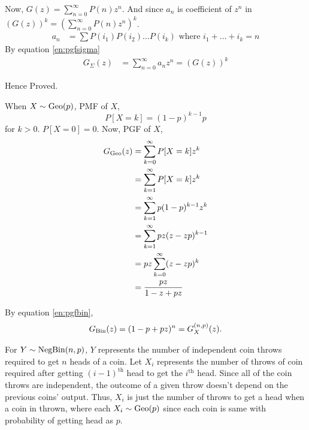 \begin{solution}
	Now, $G(z) = \sum_{n=0}^\infty P(n)z^n$.
	And since $a_n$ is coefficient of $z^n$ in $\left(G(z)\right)^k = (\sum_{n=0}^\infty P(n)z^n)^k$.
	\begin{align}
		a_n & = \sum P(i_1)P(i_2)\dots P(i_k) \text{ where } i_1+\dots+i_k=n
	\end{align}
	By equation \ref{en:pgfsigma}
	\begin{align}
		G_\Sigma(z) & = \sum_{n=0}^\infty a_nz^n = \left(G(z)\right)^k
		\label{en:pgfsigmak}
	\end{align}

	Hence Proved.



	When $X\sim\text{Geo}(p)$, PMF of $X$,
	\begin{equation}
		P[X=k] = (1-p)^{k-1}p
	\end{equation}
	for $k>0$. $P[X=0]=0$. Now, PGF of $X$,
	\begin{align}
		G_{\text{Geo}}(z) & = \sum_{k=0}^\infty P[X=k]z^k       \\
		          & = \sum_{k=1}^\infty P[X=k]z^k       \\
		          & = \sum_{k=1}^\infty p(1-p)^{k-1}z^k \\
		          & = \sum_{k=1}^\infty pz(z-zp)^{k-1}  \\
		          & = pz\sum_{k=0}^\infty (z-zp)^k      \\
		          & = \frac{pz}{1-z+pz}
		\label{en:pgfgeo}
	\end{align}




	By equation \ref{en:pgfbin},
	\begin{align}
		G_{\text{Bin}}(z) = (1-p + pz)^n = G_X^{(n,p)}(z).
	\end{align}

	For $Y\sim\text{NegBin}(n,p)$, $Y$ represents the number of independent coin
	throws required to get $n$ heads of a coin. Let $X_i$ represents the
	number of throws of coin required after getting $(i-1)^\text{th}$ head
	to get the $i^\text{th}$ head. Since all of the coin throws are
	independent, the outcome of a given throw doesn't depend on the
	previous coins' output. Thus, $X_i$ is just the number of throws to get
	a head when a coin in thrown, where each $X_i\sim\text{Geo}(p)$ since each
	coin is same with probability of getting head as $p$.


\end{solution}
